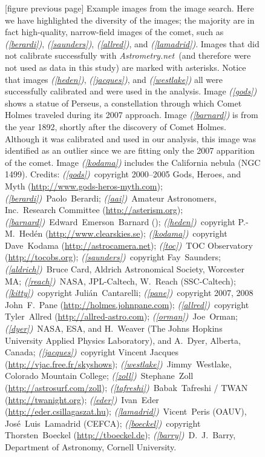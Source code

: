 \documentclass[12pt,preprint]{aastex}
\newcommand{\project}[1]{\textsl{#1}}
\newcommand{\An}{\project{Astrometry.net}}
\newcounter{thumbnail}
\newcommand{\tlabel}[1]{\textsl{({#1})}}
\begin{document}
\clearpage
\addtocounter{figure}{-1}
\begin{figure}
\caption[thumbnails]{[figure previous page]
  Example images from the image search.
  Here we have highlighted the diversity of the images; the
  majority are in fact high-quality, narrow-field images of the comet,
  such as \tlabel{\ref{berardi}}, \tlabel{\ref{saunders}},
  \tlabel{\ref{allred}}, and \tlabel{\ref{lamadrid}}.
  Images that did not calibrate successfully with \An\ (and therefore
  were not used as data in this study) are marked with asterisks.
  Notice that images \tlabel{\ref{heden}}, \tlabel{\ref{jacques}}, and \tlabel{\ref{westlake}}
  all were successfully calibrated and were used in the analysis.
  Image \tlabel{\ref{gods}} shows a statue of Perseus, a constellation through which Comet Holmes
  traveled during its 2007 approach.
  Image \tlabel{\ref{barnard}} is from the year 1892, shortly after
  the discovery of Comet Holmes.  Although it was calibrated and used
  in our analysis, this image was identified as an outlier since we
  are fitting only the 2007 apparition of the comet.
  Image \tlabel{\ref{kodama}} includes the California nebula (NGC 1499).
  Credits:
  \tlabel{\ref{gods}}~copyright 2000--2005 Gods, Heroes, and Myth (\url{http://www.gods-heros-myth.com});
  \tlabel{\ref{berardi}}~Paolo~Berardi;
  \tlabel{\ref{aai}}~Amateur Astronomers, Inc.~Research Committee (\url{http://asterism.org});
  \tlabel{\ref{barnard}}~Edward~Emerson~Barnard (\citealt{ball});
  \tlabel{\ref{heden}}~copyright P.-M.~Hed\'en (\url{http://www.clearskies.se});
  \tlabel{\ref{kodama}}~copyright Dave~Kodama (\url{http://astrocamera.net});
  \tlabel{\ref{toc}}~TOC Observatory (\url{http://tocobs.org});
  \tlabel{\ref{saunders}}~copyright Fay~Saunders;
  \tlabel{\ref{aldrich}}~Bruce Card, Aldrich Astronomical Society, Worcester MA;
  \tlabel{\ref{reach}}~NASA, JPL-Caltech, W.~Reach (SSC-Caltech);
  \tlabel{\ref{kitty}}~copyright Juli\'an~Cantarelli;
  \tlabel{\ref{pane}}~copyright 2007, 2008 John~F.~Pane (\url{http://holmes.johnpane.com});
  \tlabel{\ref{allred}}~copyright Tyler~Allred (\url{http://allred-astro.com});
  \tlabel{\ref{orman}}~Joe~Orman;
  \tlabel{\ref{dyer}}~NASA, ESA, and H.~Weaver (The Johns Hopkins University Applied Physics Laboratory), and A.~Dyer, Alberta, Canada;
  \tlabel{\ref{jacques}}~copyright Vincent Jacques (\url{http://vjac.free.fr/skyshows});
  \tlabel{\ref{westlake}}~Jimmy~Westlake, Colorado Mountain College;
  \tlabel{\ref{zoll}}~Stephane~Zoll (\url{http://astrosurf.com/zoll});
  \tlabel{\ref{tafreshi}}~Babak~Tafreshi / TWAN (\url{http://twanight.org});
  \tlabel{\ref{eder}}~Ivan~Eder (\url{http://eder.csillagaszat.hu});
  \tlabel{\ref{lamadrid}}~Vicent~Peris (OAUV), Jos\'e~Luis~Lamadrid (CEFCA);
  \tlabel{\ref{boeckel}}~copyright Thorsten~Boeckel (\url{http://tboeckel.de});
  \tlabel{\ref{barry}}~D.~J.~Barry, Department of Astronomy, Cornell University.
  }
\end{figure}
\end{document}
